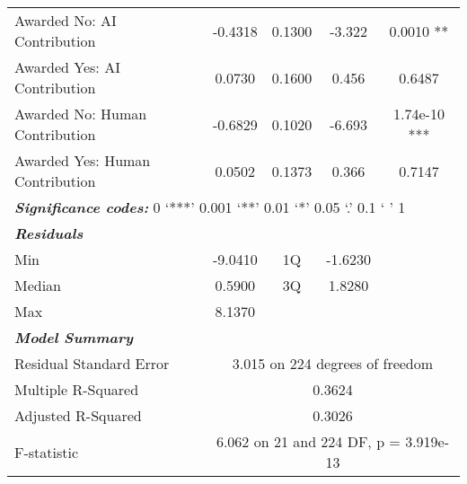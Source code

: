 \begin{table}[ht]
\begin{tabular}{lcccc}
        Awarded No: AI Contribution & -0.4318  & 0.1300  & -3.322  & 0.0010 **  \\
        Awarded Yes: AI Contribution & 0.0730  & 0.1600  & 0.456  & 0.6487  \\
        Awarded No: Human Contribution & -0.6829  & 0.1020  & -6.693  & 1.74e-10 ***  \\
        Awarded Yes: Human Contribution & 0.0502  & 0.1373  & 0.366  & 0.7147  \\
        \midrule
        \multicolumn{5}{l}{\textbf{\textit{Significance codes:}} 0 ‘***’ 0.001 ‘**’ 0.01 ‘*’ 0.05 ‘.’ 0.1 ‘ ’ 1} \\
        \midrule
        \textbf{\textit{Residuals}} & \multicolumn{4}{c}{} \\
        Min & -9.0410 & 1Q & -1.6230 &  \\
        Median & 0.5900 & 3Q & 1.8280 &  \\
        Max & 8.1370 &  &  &  \\
        \midrule
        \textbf{\textit{Model Summary}}\\
        Residual Standard Error & \multicolumn{4}{c}{3.015 on 224 degrees of freedom} \\
        Multiple R-Squared & \multicolumn{4}{c}{0.3624} \\
        Adjusted R-Squared & \multicolumn{4}{c}{0.3026} \\
        F-statistic & \multicolumn{4}{c}{6.062 on 21 and 224 DF, p = 3.919e-13} \\
        \bottomrule
    \end{tabular}
    \label{tab:regression_willingness_female}
\end{table}


